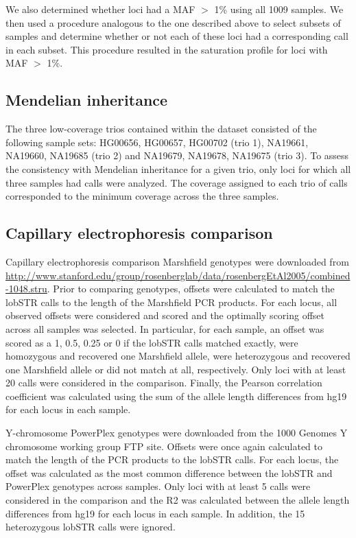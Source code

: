 We also determined whether loci had a MAF $>$ 1\% using all 1009 samples. We then used a procedure analogous to the one described above to select subsets of samples and determine whether or not each of these loci had a corresponding call in each subset. This procedure resulted in the saturation profile for loci with MAF $>$ 1\%. 

\subsection{Mendelian inheritance}
The three low-coverage trios contained within the dataset consisted of the following sample sets: HG00656, HG00657, HG00702 (trio 1), NA19661, NA19660, NA19685 (trio 2) and NA19679, NA19678, NA19675 (trio 3). To assess the consistency with Mendelian inheritance for a given trio, only loci for which all three samples had calls were analyzed. The coverage assigned to each trio of calls corresponded to the minimum coverage across the three samples. 

\subsection{Capillary electrophoresis comparison}
Capillary electrophoresis comparison Marshfield genotypes \cite{Rosenberg2006} were downloaded from \url{http://www.stanford.edu/group/rosenberglab/data/rosenbergEtAl2005/combined-1048.stru}. Prior to comparing genotypes, offsets were calculated to match the lobSTR calls to the length of the Marshfield PCR products. For each locus, all observed offsets were considered and scored and the optimally scoring offset across all samples was selected. In particular, for each sample, an offset was scored as a 1, 0.5, 0.25 or 0 if the lobSTR calls matched exactly, were homozygous and recovered one Marshfield allele, were heterozygous and recovered one Marshfield allele or did not match at all, respectively.  Only loci with at least 20 calls were considered in the comparison. Finally, the Pearson correlation coefficient was calculated using the sum of the allele length differences from hg19 for each locus in each sample.

Y-chromosome PowerPlex genotypes were downloaded from the 1000 Genomes Y chromosome working group FTP site. Offsets were once again calculated to match the length of the PCR products to the lobSTR calls. For each locus, the offset was calculated as the most common difference between the lobSTR and PowerPlex genotypes across samples. Only loci with at least 5 calls were considered in the comparison and the R2 was calculated between the allele length differences from hg19 for each locus in each sample. In addition, the 15 heterozygous lobSTR calls were ignored.  

